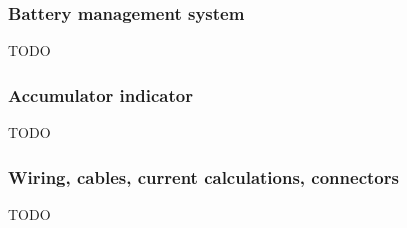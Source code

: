 \documentclass{article}
\begin{document}
\subsubsection{Battery management system}

TODO

\subsubsection{Accumulator indicator}
TODO

\subsubsection{Wiring, cables, current calculations, connectors}

TODO
\end{document}
